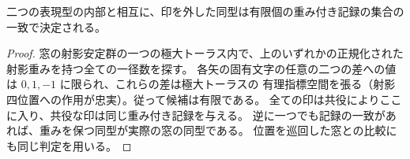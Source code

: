 \begin{corollary}\label{cor:binary-torus-unmark}
二つの表現型の内部と相互に、印を外した同型は有限個の重み付き記録の集合の一致で決定される。
\end{corollary}
\begin{proof}
窓の射影安定群の一つの極大トーラス内で、上のいずれかの正規化された射影重みを持つ全ての一径数を探す。
各矢の固有文字の任意の二つの差への値は $0,1,-1$ に限られ、これらの差は極大トーラスの
有理指標空間を張る（射影四位置への作用が忠実）。従って候補は有限である。
全ての印は共役によりここに入り、共役な印は同じ重み付き記録を与える。
逆に一つでも記録の一致があれば、重みを保つ同型が実際の窓の同型である。
位置を巡回した窓との比較にも同じ判定を用いる。
\end{proof}
